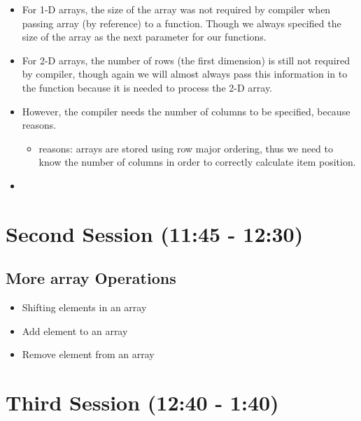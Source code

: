 \documentclass[11pt]{article}
\begin{document}
\begin{itemize}
\item For 1-D arrays, the size of the array was not required by compiler
when passing array (by reference) to a function.  Though we always
specified the size of the array as the next parameter for our functions.

\item For 2-D arrays, the number of rows (the first dimension) is still not
required by compiler, though again we will almost always pass this
information in to the function because it is needed to process the
2-D array.
\item However, the compiler needs the number of columns to be specified, 
because reasons.
\begin{itemize}
\item reasons: arrays are stored using row major ordering, thus we need to
know the number of columns in order to correctly calculate item
position.
\end{itemize}
\item 
\end{itemize}
\section{Second Session (11:45 - 12:30)}
\label{sec-2}
\subsection{More array Operations}
\label{sec-2-1}
\begin{itemize}
\item Shifting elements in an array
\item Add element to an array
\item Remove element from an array
\end{itemize}

\section{Third Session (12:40 - 1:40)}
\label{sec-3}
\end{document}

